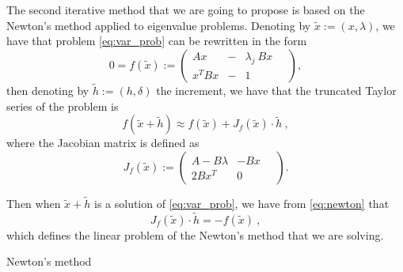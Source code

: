 \documentclass[preprint ,12pt]{elsarticle}
\begin{document}
The second iterative method that we are going to propose is based on the Newton's method applied to eigenvalue problems. Denoting by $\tilde x:=(x,\lambda)$, we have that problem \eqref{eq:var_prob} can be rewritten in the form
$$
0=f(\tilde x):=
\left(
\begin{array}{lcl}
A x&-& \lambda_j\ Bx
\\
  x^T Bx&-& 1
\end{array}\quad
\right) ,
$$
then denoting by $\tilde h:=(h, \delta)$ the increment, we have that the truncated Taylor series of the problem is
\begin{equation}\label{eq:newton}
f(\tilde x + \tilde h)\approx f(\tilde x) + J_f(\tilde x)\cdot \tilde h\ , 
\end{equation}
where the Jacobian matrix is defined as
$$
J_f(\tilde x):=
\left(
\begin{array}{lr}
A - B\lambda & -Bx
\\
  2Bx^T  & 0
\end{array}\quad
\right) .
$$

Then when $\tilde x + \tilde h$ is a solution of \eqref{eq:var_prob}, we have from \eqref{eq:newton}
that 
$$
J_f(\tilde x)\cdot \tilde h = - f(\tilde x)\ ,
$$
which defines the linear problem of the Newton's method that we are solving.
\begin{algorithm}[H] \caption{Newton's method} \label{alg:newton} 
\begin{algorithmic}


\REPEAT

\end{algorithmic}
\end{algorithm}
\end{document}
